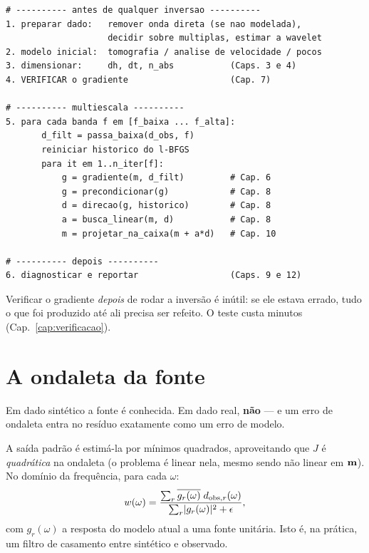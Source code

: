 \documentclass[11pt,a4paper,oneside]{report}
\begin{document}
\begin{lstlisting}
# ---------- antes de qualquer inversao ----------
1. preparar dado:   remover onda direta (se nao modelada),
                    decidir sobre multiplas, estimar a wavelet
2. modelo inicial:  tomografia / analise de velocidade / pocos
3. dimensionar:     dh, dt, n_abs           (Caps. 3 e 4)
4. VERIFICAR o gradiente                    (Cap. 7)

# ---------- multiescala ----------
5. para cada banda f em [f_baixa ... f_alta]:
       d_filt = passa_baixa(d_obs, f)
       reiniciar historico do l-BFGS
       para it em 1..n_iter[f]:
           g = gradiente(m, d_filt)         # Cap. 6
           g = precondicionar(g)            # Cap. 8
           d = direcao(g, historico)        # Cap. 8
           a = busca_linear(m, d)           # Cap. 8
           m = projetar_na_caixa(m + a*d)   # Cap. 10

# ---------- depois ----------
6. diagnosticar e reportar                  (Caps. 9 e 12)
\end{lstlisting}

\begin{atencao}
Verificar o gradiente \emph{depois} de rodar a invers\~ao \'e in\'util: se ele
estava errado, tudo o que foi produzido at\'e ali precisa ser refeito. O
teste custa minutos (Cap.~\ref{cap:verificacao}).
\end{atencao}

\section{A ondaleta da fonte}

Em dado sint\'etico a fonte \'e conhecida. Em dado real, \textbf{n\~ao} --- e
um erro de ondaleta entra no res\'iduo exatamente como um erro de modelo.

A sa\'ida padr\~ao \'e estim\'a-la por m\'inimos quadrados, aproveitando que
$J$ \'e \emph{quadr\'atica} na ondaleta (o problema \'e linear nela, mesmo
sendo n\~ao linear em $\mathbf{m}$). No dom\'inio da frequ\^encia, para cada
$\omega$:
\begin{equation}
w(\omega) = \frac{\sum_{r} \overline{g_r(\omega)}\;d_{\text{obs},r}(\omega)}
                 {\sum_{r} \lvert g_r(\omega) \rvert^{2} + \epsilon},
\label{eq:fonte}
\end{equation}
com $g_r(\omega)$ a resposta do modelo atual a uma fonte unit\'aria. Isto \'e,
na pr\'atica, um filtro de casamento entre sint\'etico e observado.
\end{document}
